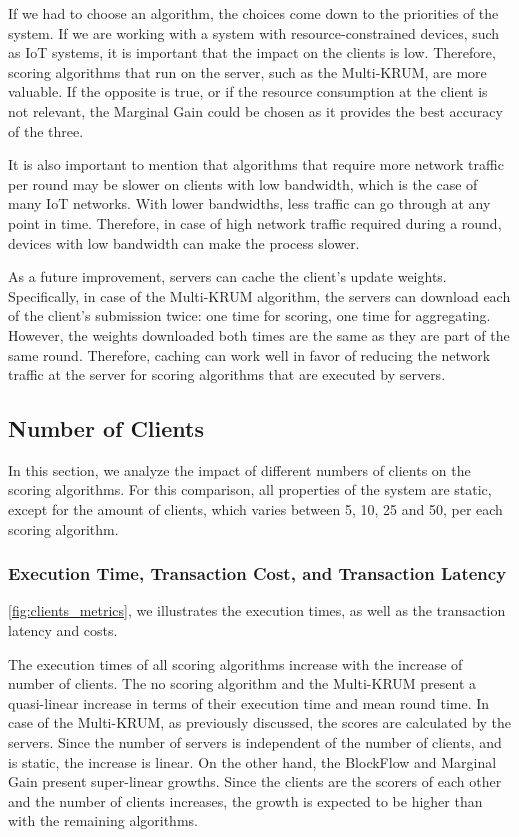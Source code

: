 If we had to choose an algorithm, the choices come down to the priorities of the system. If we are working with a system with resource-constrained devices, such as IoT systems, it is important that the impact on the clients is low. Therefore, scoring algorithms that run on the server, such as the Multi-KRUM, are more valuable. If the opposite is true, or if the resource consumption at the client is not relevant, the Marginal Gain could be chosen as it provides the best accuracy of the three.

It is also important to mention that algorithms that require more network traffic per round may be slower on clients with low bandwidth, which is the case of many IoT networks. With lower bandwidths, less traffic can go through at any point in time. Therefore, in case of high network traffic required during a round, devices with low bandwidth can make the process slower.

As a future improvement, servers can cache the client's update weights. Specifically, in case of the Multi-KRUM algorithm, the servers can download each of the client's submission twice: one time for scoring, one time for aggregating. However, the weights downloaded both times are the same as they are part of the same round. Therefore, caching can work well in favor of reducing the network traffic at the server for scoring algorithms that are executed by servers.

\subsection{Number of Clients}\label{horizontal:number_of_clients}

In this section, we analyze the impact of different numbers of clients on the scoring algorithms. For this comparison, all properties of the system are static, except for the amount of clients, which varies between 5, 10, 25 and 50, per each scoring algorithm.

\subsubsection{Execution Time, Transaction Cost, and Transaction Latency}

\autoref{fig:clients_metrics}, we illustrates the execution times, as well as the transaction latency and costs.

The execution times of all scoring algorithms increase with the increase of number of clients. The no scoring algorithm and the Multi-KRUM present a quasi-linear increase in terms of their execution time and mean round time. In case of the Multi-KRUM, as previously discussed, the scores are calculated by the servers. Since the number of servers is independent of the number of clients, and is static, the increase is linear. On the other hand, the BlockFlow and Marginal Gain present super-linear growths. Since the clients are the scorers of each other and the number of clients increases, the growth is expected to be higher than with the remaining algorithms.

